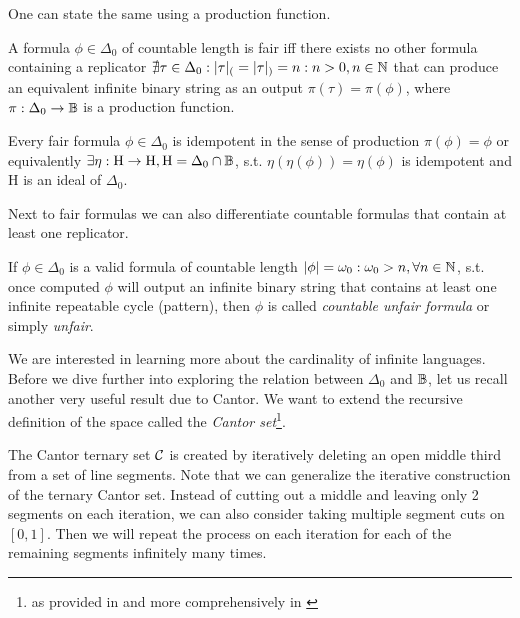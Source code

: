 One can state the same using a production function.

\begin{lemma}
  A formula $\phi \in \Delta_0$ of countable length is fair iff there exists no other formula containing a replicator $\nexists \tau \in \Delta_0: |\tau|_{(} = |\tau|_{)} = n: n > 0, n \in \mathbb{N}$ that can produce an equivalent infinite binary string as an output $\pi(\tau) = \pi(\phi)$, where $\pi: \Delta_0 \to \mathbb{B}$ is a production function.
\end{lemma}

\begin{lemma}
  Every fair formula $\phi \in \Delta_0$ is idempotent in the sense of production $\pi(\phi) = \phi$ or equivalently $\exists \eta: \mathrm{H} \to \mathrm{H}, \mathrm{H} = \Delta_0 \cap \mathbb{B}$, s.t. $\eta(\eta(\phi)) = \eta(\phi)$ is idempotent and $\mathrm{H}$ is an ideal of $\Delta_0$.
\end{lemma}

Next to fair formulas we can also differentiate countable formulas that contain at least one replicator.

\begin{definition}\label{def_unfair_sef}
  If $\phi \in \Delta_0$ is a valid formula of countable length $|\phi| = \omega_0: \omega_0 > n, \forall n \in \mathbb{N}$, s.t. once computed $\phi$ will output an infinite binary string that contains at least one infinite repeatable cycle (pattern), then $\phi$ is called \textit{countable unfair formula} or simply \textit{unfair}.
\end{definition}

We are interested in learning more about the cardinality of infinite languages. Before we dive further into exploring the relation between $\Delta_0$ and $\mathbb{B}$, let us  recall another very useful result due to Cantor. We want to extend the recursive definition of the space called the \textit{Cantor set}\footnote{as provided in \cite{jech2003set} and more comprehensively in \cite{enwiki:1071687681}}.

The Cantor ternary set $\mathcal{C}$ is created by iteratively deleting an open middle third from a set of line segments. Note that we can generalize the iterative construction of the ternary Cantor set. Instead of cutting out a middle and leaving only 2 segments on each iteration, we can also consider taking multiple segment cuts on $[0,1]$. Then we will repeat the process on each iteration for each of the remaining segments infinitely many times.

